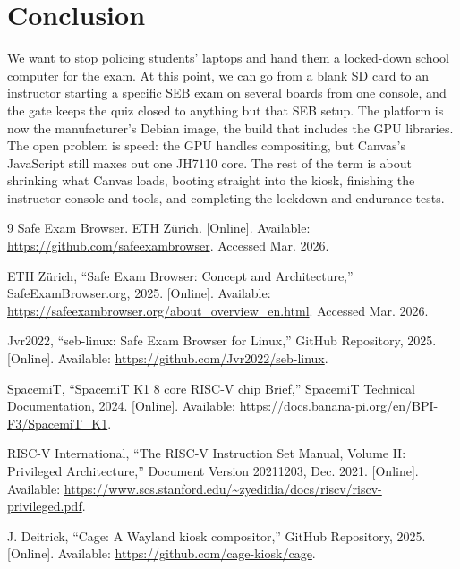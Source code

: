 \documentclass[11pt]{article}
\begin{document}
\section{Conclusion}

We want to stop policing students' laptops and hand them a locked-down school computer for the exam. At this point, we can go from a blank SD card to an instructor starting a specific SEB exam on several boards from one console, and the gate keeps the quiz closed to anything but that SEB setup. The platform is now the manufacturer's Debian image, the build that includes the GPU libraries. The open problem is speed: the GPU handles compositing, but Canvas's JavaScript still maxes out one JH7110 core. The rest of the term is about shrinking what Canvas loads, booting straight into the kiosk, finishing the instructor console and tools, and completing the lockdown and endurance tests.

\newpage
\begin{thebibliography}{9}
Safe Exam Browser. ETH Z\"{u}rich. [Online]. Available: \url{https://github.com/safeexambrowser}. Accessed Mar. 2026.

ETH Z\"{u}rich, ``Safe Exam Browser: Concept and Architecture,'' SafeExamBrowser.org, 2025. [Online]. Available: \url{https://safeexambrowser.org/about_overview_en.html}. Accessed Mar. 2026.

Jvr2022, ``seb-linux: Safe Exam Browser for Linux,'' GitHub Repository, 2025. [Online]. Available: \url{https://github.com/Jvr2022/seb-linux}.

SpacemiT, ``SpacemiT K1 8 core RISC-V chip Brief,'' SpacemiT Technical Documentation, 2024. [Online]. Available: \url{https://docs.banana-pi.org/en/BPI-F3/SpacemiT_K1}.

RISC-V International, ``The RISC-V Instruction Set Manual, Volume II: Privileged Architecture,'' Document Version 20211203, Dec. 2021. [Online]. Available: \url{https://www.scs.stanford.edu/~zyedidia/docs/riscv/riscv-privileged.pdf}.

J. Deitrick, ``Cage: A Wayland kiosk compositor,'' GitHub Repository, 2025. [Online]. Available: \url{https://github.com/cage-kiosk/cage}.
\end{thebibliography}
\end{document}
